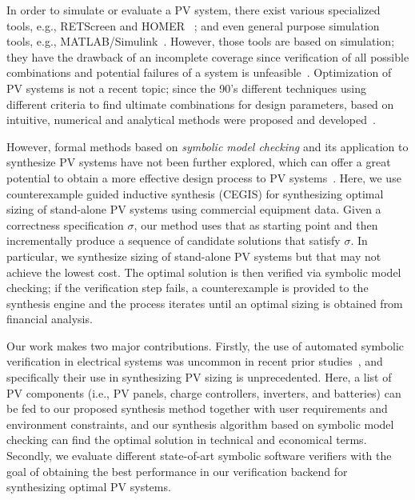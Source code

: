 \documentclass[10pt,conference]{IEEEtran}
\begin{document}
In order to simulate or evaluate a PV system, there exist various specialized tools, e.g., RETScreen and HOMER~\cite{Pradhan,Swarnkar}%
; and even general purpose simulation tools, e.g., MATLAB/Simulink~\cite{Gow1999}. %
 However, those tools are based on simulation; they have the drawback of an incomplete coverage  since verification of all possible combinations and potential failures of a system is unfeasible~\cite{ClarkeHV18}. 
 Optimization of PV systems is not a recent topic; since the 90's different techniques using different criteria to find ultimate combinations for design parameters, based on intuitive, numerical and analytical methods were proposed and developed~\cite{Alsadi2018}.
 
However, formal methods based on \textit{symbolic model checking} and its application to synthesize PV systems have not been further explored, which can offer a great potential to obtain a more effective design process to PV systems~\cite{ClarkeHV18}. Here, we use counterexample guided inductive synthesis (CEGIS) for synthesizing optimal sizing of stand-alone PV systems using commercial equipment data. Given a correctness specification $\sigma$, our method uses that as starting point and then incrementally produce a sequence of candidate solutions that satisfy $\sigma$. In particular, we synthesize sizing of stand-alone PV systems but that may not achieve the lowest cost. The optimal solution is then verified via symbolic model checking; if the verification step fails, a counterexample is provided to the synthesis engine and the process iterates until an optimal sizing is obtained from financial analysis.

Our work makes two major contributions. Firstly, the use of automated symbolic verification in electrical systems was uncommon in recent prior studies~\cite{abs-1811-09438}, and specifically their use in synthesizing PV sizing is unprecedented. Here, a list of PV components (i.e., PV panels, charge controllers, inverters, and batteries) can be fed to our proposed synthesis method together with user requirements and environment constraints, and our synthesis algorithm based on symbolic model checking can find the optimal solution in technical and economical terms. Secondly, we evaluate different state-of-art symbolic software verifiers with the goal of obtaining the best performance in our verification backend for synthesizing optimal PV systems.
%
\end{document}
